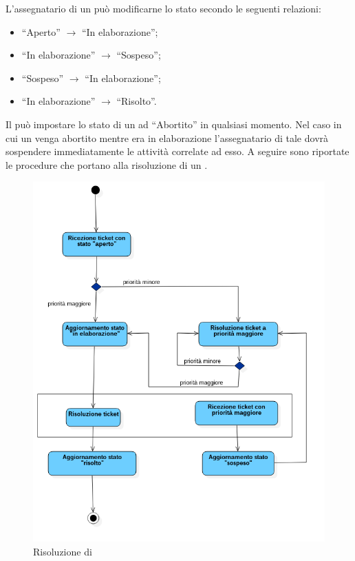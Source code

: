 \documentclass[a4paper, titlepage]{article}
\begin{document}
L'assegnatario di un  può modificarne lo stato secondo le seguenti relazioni:
\begin{itemize}
	\item ``Aperto'' $\to$ ``In elaborazione'';
	\item ``In elaborazione'' $\to$ ``Sospeso'';
	\item ``Sospeso'' $\to$ ``In elaborazione'';
	\item ``In elaborazione'' $\to$ ``Risolto''.
\end{itemize}
Il  può impostare lo stato di un  ad ``Abortito'' in qualsiasi momento. Nel caso in cui un  venga abortito mentre era in elaborazione l'assegnatario di tale  dovrà sospendere immediatamente le attività correlate ad esso.
\newpage
A seguire sono riportate le procedure che portano alla risoluzione di un .
\begin{figure}[!h]
	\includegraphics[width=\textwidth]{Img/flowticket.png}
	\caption{Risoluzione di }
	\label{fig:documento}
\end{figure}
\newpage
\end{document}
